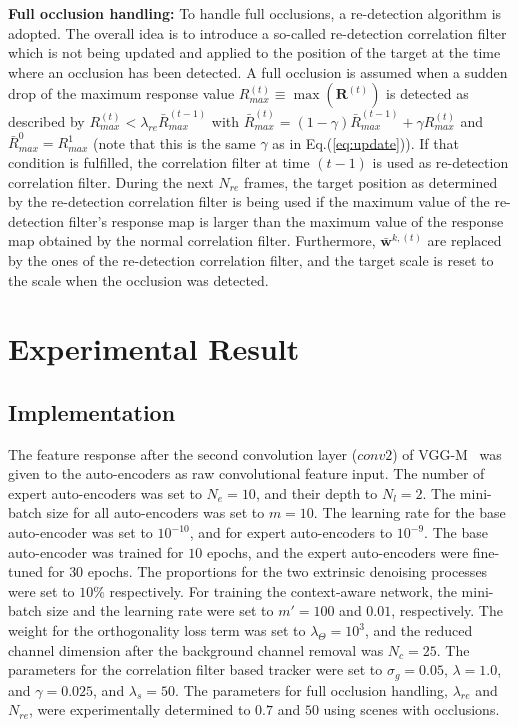 \documentclass[10pt,twocolumn,letterpaper]{article}
\begin{document}
\textbf{Full occlusion handling: }
To handle full occlusions, a re-detection algorithm is adopted. 
The overall idea is to introduce a so-called re-detection correlation filter which is not being updated and applied to the position of the target at the time where an occlusion has been detected. 
A full occlusion is assumed when a sudden drop of the maximum response value $R_{max}^{(t)}\equiv\max(\mathbf{R}^{(t)})$ is detected as described by $R_{max}^{(t)} < \lambda_{re} \bar{R}_{max}^{(t-1)}$ with $\bar{R}_{max}^{(t)}=(1-\gamma)\bar{R}_{max}^{(t-1)} + \gamma R_{max}^{(t)}$ and $\bar{R}_{max}^0 = R_{max}^1$ (note that this is the same $\gamma$ as in Eq.(\ref{eq:update})). If that condition is fulfilled, the correlation filter at time $(t-1)$ is used as re-detection correlation filter. 
During the next $N_{re}$ frames, the target position as determined by the re-detection correlation filter is being used if the maximum value of the re-detection filter's response map is larger than the maximum value of the response map obtained by the normal correlation filter. 
Furthermore, $\bar{\mathbf{w}}^{k,(t)}$ are replaced by the ones of the re-detection correlation filter, and the target scale is reset to the scale when the occlusion was detected.

 \section{Experimental Result}

\subsection{Implementation}
The feature response after the second convolution layer ($conv2$) of VGG-M~\cite{ref:vggm} was given to the auto-encoders as raw convolutional feature input.
The number of expert auto-encoders was set to $N_e=10$, and their depth to $N_l=2$.
The mini-batch size for all auto-encoders was set to $m=10$.
The learning rate for the base auto-encoder was set to $10^{-10}$, and for expert auto-encoders to $10^{-9}$.
The base auto-encoder was trained for $10$ epochs, and the expert auto-encoders were fine-tuned for $30$ epochs.
The proportions for the two extrinsic denoising processes were set to $10\%$ respectively.
For training the context-aware network, the mini-batch size and the learning rate were set to $m'=100$ and $0.01$, respectively.
The weight for the orthogonality loss term was set to $\lambda_\Theta=10^3$, and the reduced channel dimension after the background channel removal was $N_c=25$.
The parameters for the correlation filter based tracker were set to $\sigma_g=0.05$, $\lambda=1.0$, and $\gamma=0.025$, and $\lambda_s=50$.
The parameters for full occlusion handling, $\lambda_{re}$ and $N_{re}$, were experimentally determined to $0.7$ and $50$ using scenes with occlusions.
\end{document}
